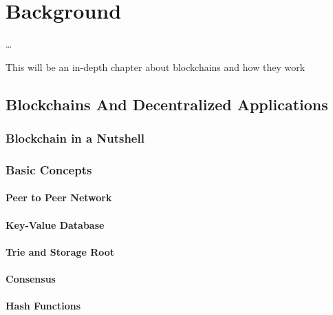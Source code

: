 
\chapter{Background} \label{chap:background} %



\ifpdf
    \graphicspath{{7/figures/PNG/}{7/figures/PDF/}{7/figures/}}
\else
    \graphicspath{{7/figures/EPS/}{7/figures/}}
\fi


% 

\dots

This will be an in-depth chapter about blockchains and how they work

\section{Blockchains And Decentralized Applications}

\subsection{Blockchain in a Nutshell}

\subsection{Basic Concepts}

\subsubsection{Peer to Peer Network}
\subsubsection{Key-Value Database}
\subsubsection{Trie and Storage Root}
\subsubsection{Consensus}
\subsubsection{Hash Functions}
